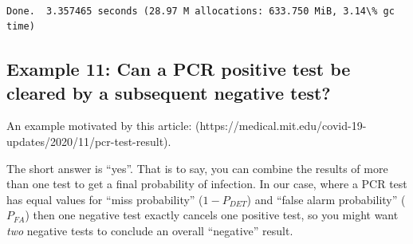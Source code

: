 \documentclass[11pt]{article}
\begin{document}
    \begin{Verbatim}[commandchars=\\\{\}]

Done.  3.357465 seconds (28.97 M allocations: 633.750 MiB, 3.14\% gc time)
    \end{Verbatim}
\newpage
    \hypertarget{example-11-can-a-pcr-positive-test-be-cleared-by-a-subsequent-negative-test}{%
\subsection{Example 11: Can a PCR positive test be cleared by a
subsequent negative
test?}\label{example-11-can-a-pcr-positive-test-be-cleared-by-a-subsequent-negative-test}}

An example motivated by this article:
(https://medical.mit.edu/covid-19-updates/2020/11/pcr-test-result).

The short answer is ``yes''. That is to say, you can combine the results
of more than one test to get a final probability of infection. In our
case, where a PCR test has equal values for ``miss probability''
(\(1-P_{DET}\)) and ``false alarm probability'' (\(P_{FA}\)) then one
negative test exactly cancels one positive test, so you might want
\emph{two} negative tests to conclude an overall ``negative'' result.
\end{document}
